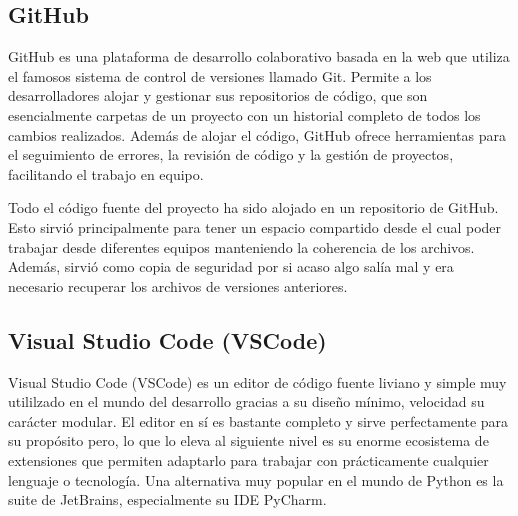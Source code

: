 \subsection{GitHub}


GitHub es una plataforma de desarrollo colaborativo basada en la web que utiliza el famosos sistema de control de versiones llamado Git. Permite a los desarrolladores alojar y gestionar sus repositorios de código, que son esencialmente carpetas de un proyecto con un historial completo de todos los cambios realizados. Además de alojar el código, GitHub ofrece herramientas para el seguimiento de errores, la revisión de código y la gestión de proyectos, facilitando el trabajo en equipo.

Todo el código fuente del proyecto ha sido alojado en un repositorio de GitHub. Esto sirvió principalmente para tener un espacio compartido desde el cual poder trabajar desde diferentes equipos manteniendo la coherencia de los archivos. Además, sirvió como copia de seguridad por si acaso algo salía mal y era necesario recuperar los archivos de versiones anteriores.

\subsection{Visual Studio Code (VSCode)}


Visual Studio Code (VSCode) es un editor de código fuente liviano y simple muy utililzado en el mundo del desarrollo gracias a su diseño mínimo, velocidad su carácter modular. El editor en sí es bastante completo y sirve perfectamente para su propósito pero, lo que lo eleva al siguiente nivel es su enorme ecosistema de extensiones que permiten adaptarlo para trabajar con prácticamente cualquier lenguaje o tecnología. Una alternativa muy popular en el mundo de Python es la suite de JetBrains, especialmente su IDE PyCharm.

